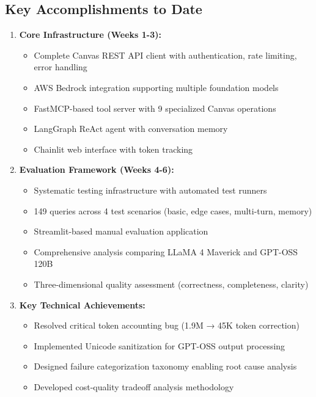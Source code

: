 \documentclass{article}
\begin{document}
\subsection{Key Accomplishments to Date}

\begin{enumerate}
    \item \textbf{Core Infrastructure (Weeks 1-3):}
    \begin{itemize}
        \item Complete Canvas REST API client with authentication, rate limiting, error handling
        \item AWS Bedrock integration supporting multiple foundation models
        \item FastMCP-based tool server with 9 specialized Canvas operations
        \item LangGraph ReAct agent with conversation memory
        \item Chainlit web interface with token tracking
    \end{itemize}
    
    \item \textbf{Evaluation Framework (Weeks 4-6):}
    \begin{itemize}
        \item Systematic testing infrastructure with automated test runners
        \item 149 queries across 4 test scenarios (basic, edge cases, multi-turn, memory)
        \item Streamlit-based manual evaluation application
        \item Comprehensive analysis comparing LLaMA 4 Maverick and GPT-OSS 120B
        \item Three-dimensional quality assessment (correctness, completeness, clarity)
    \end{itemize}
    
    \item \textbf{Key Technical Achievements:}
    \begin{itemize}
        \item Resolved critical token accounting bug (1.9M → 45K token correction)
        \item Implemented Unicode sanitization for GPT-OSS output processing
        \item Designed failure categorization taxonomy enabling root cause analysis
        \item Developed cost-quality tradeoff analysis methodology
    \end{itemize}
\end{enumerate}
\end{document}
